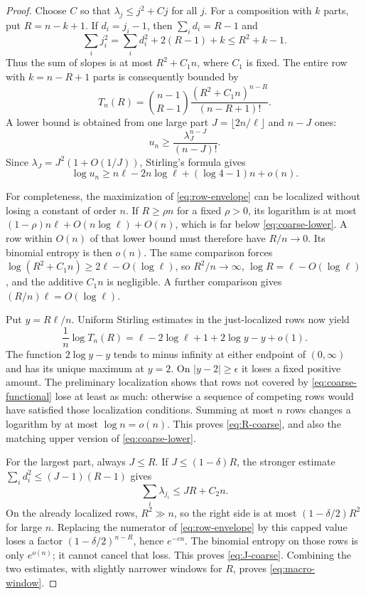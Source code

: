 \documentclass[11pt,a4paper]{article}
\theoremstyle{definition}
\numberwithin{equation}{section}
\begin{document}
\begin{proof}
Choose \(C\) so that \(\lambda_j\le j^2+Cj\) for all \(j\).
For a composition with \(k\) parts, put \(R=n-k+1\). If
\(d_i=j_i-1\), then \(\sum_i d_i=R-1\) and
\[
 \sum_i j_i^2=\sum_i d_i^2+2(R-1)+k
              \le R^2+k-1.
\]
Thus the sum of slopes is at most \(R^2+C_1n\), where \(C_1\) is fixed.
The entire row with \(k=n-R+1\) parts is consequently bounded by
\begin{equation}
 T_n(R)=\binom{n-1}{R-1}
         \frac{(R^2+C_1n)^{n-R}}{(n-R+1)!}.
 \label{eq:row-envelope}
\end{equation}
A lower bound is obtained from one large part
\(J=\lfloor2n/\ell\rfloor\) and \(n-J\) ones:
\[
 u_n\ge\frac{\lambda_J^{n-J}}{(n-J)!}.
\]
Since \(\lambda_J=J^2(1+O(1/J))\), Stirling's formula gives
\begin{equation}
 \log u_n\ge n\ell-2n\log\ell+(\log4-1)n+o(n).
 \label{eq:coarse-lower}
\end{equation}

For completeness, the maximization of \eqref{eq:row-envelope} can be
localized without losing a constant of order \(n\). If \(R\ge\rho n\)
for a fixed \(\rho>0\), its logarithm is at most
\((1-\rho)n\ell+O(n\log\ell)+O(n)\), which is far below
\eqref{eq:coarse-lower}. A row within \(O(n)\) of that lower bound must
therefore have \(R/n\to0\). Its binomial entropy is then \(o(n)\).
The same comparison forces
\(\log(R^2+C_1n)\ge2\ell-O(\log\ell)\), so
\(R^2/n\to\infty\), \(\log R=\ell-O(\log\ell)\), and the additive
\(C_1n\) is negligible. A further comparison gives
\((R/n)\ell=O(\log\ell)\).

Put \(y=R\ell/n\). Uniform Stirling estimates in the just-localized rows
now yield
\begin{equation}
 \frac1n\log T_n(R)
 =\ell-2\log\ell+1+2\log y-y+o(1).
 \label{eq:coarse-functional}
\end{equation}
The function \(2\log y-y\) tends to minus infinity at either endpoint of
\((0,\infty)\) and has its unique maximum at \(y=2\).
On \(|y-2|\ge\epsilon\) it loses a fixed positive amount. The preliminary
localization shows that rows not covered by \eqref{eq:coarse-functional}
lose at least as much: otherwise a sequence of competing rows would have
satisfied those localization conditions. Summing at most \(n\) rows changes
a logarithm by at most \(\log n=o(n)\). This proves
\eqref{eq:R-coarse}, and also the matching upper version of
\eqref{eq:coarse-lower}.

For the largest part, always \(J\le R\). If \(J\le(1-\delta)R\), the
stronger estimate \(\sum_i d_i^2\le(J-1)(R-1)\) gives
\[
 \sum_i\lambda_{j_i}\le JR+C_2n.
\]
On the already localized rows, \(R^2\gg n\), so the right side is at most
\((1-\delta/2)R^2\) for large \(n\). Replacing the numerator of
\eqref{eq:row-envelope} by this capped value loses a factor
\((1-\delta/2)^{n-R}\), hence \(e^{-c n}\). The binomial entropy on those
rows is only \(e^{o(n)}\); it cannot cancel that loss. This proves
\eqref{eq:J-coarse}. Combining the two estimates, with slightly narrower
windows for \(R\), proves \eqref{eq:macro-window}.
\end{proof}
\end{document}
